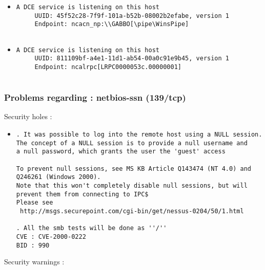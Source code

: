 \documentclass{article}
\begin{document}
\begin{itemize}
\begin{verbatim}
\end{verbatim}\item \begin{verbatim}
A DCE service is listening on this host
     UUID: 45f52c28-7f9f-101a-b52b-08002b2efabe, version 1
     Endpoint: ncacn_np:\\GABBO[\pipe\WinsPipe]


\end{verbatim}\item \begin{verbatim}
A DCE service is listening on this host
     UUID: 811109bf-a4e1-11d1-ab54-00a0c91e9b45, version 1
     Endpoint: ncalrpc[LRPC0000053c.00000001]


\end{verbatim}\end{itemize}
\subsubsection{Problems regarding : netbios-ssn (139/tcp)}
Security holes :\\
\begin{itemize}
\item \begin{verbatim}
. It was possible to log into the remote host using a NULL session.
The concept of a NULL session is to provide a null username and
a null password, which grants the user the 'guest' access

To prevent null sessions, see MS KB Article Q143474 (NT 4.0) and
Q246261 (Windows 2000). 
Note that this won't completely disable null sessions, but will 
prevent them from connecting to IPC$
Please see
 http://msgs.securepoint.com/cgi-bin/get/nessus-0204/50/1.html

. All the smb tests will be done as ''/''
CVE : CVE-2000-0222
BID : 990
\end{verbatim}\end{itemize}
Security warnings :\\
\end{document}
